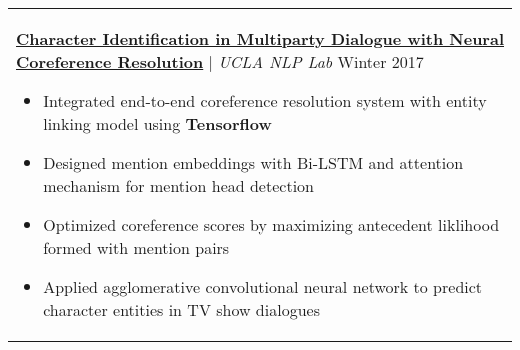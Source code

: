 \documentclass[letterpaper,11pt]{article} %
\begin{document}
{\begin{tabular}{p{18.5cm}}
\href{}{\bf{Character Identification in Multiparty Dialogue with Neural Coreference Resolution}} | {\it{UCLA NLP Lab}} \hfill Winter 2017
\begin{itemize}
\item Integrated end-to-end coreference resolution system with entity linking model using {\bf Tensorflow} 
\item Designed mention embeddings with Bi-LSTM and attention mechanism for mention head detection 
\item Optimized coreference scores by maximizing antecedent liklihood formed with mention pairs
\item Applied agglomerative convolutional neural network to predict character entities in TV show dialogues\vspace*{-\baselineskip}
\end{itemize} \\

\end{tabular}

%

}
\end{document}
